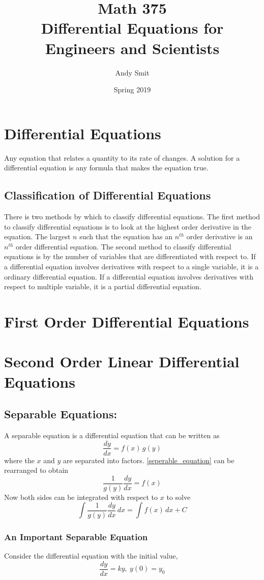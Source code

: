 \documentclass[14pt]{article}
\title{Math 375\\Differential Equations for Engineers and Scientists}
\author{Andy Smit}
\date{Spring 2019}
\begin{document}
    \maketitle
    \section{Differential Equations}
    Any equation that relates a quantity to its rate of changes.
    A solution for a differential equation is any formula that makes the equation true.
    \subsection{Classification of Differential Equations}
    There is two methods by which to classify differential equations.
    The first method to classify differential equations is to look at the highest order derivative in the equation.
    The largest $n$ such that the equation has an $n^{th}$ order derivative is an $n^{th}$ order differential equation.
    The second method to classify differential equations is by the number of variables that are differentiated with respect to.
    If a differential equation involves derivatives with respect to a single variable, it is a ordinary differential equation.
    If a differential equation involves derivatives with respect to multiple variable, it is a partial differential equation.
    \section{First Order Differential Equations}
    \section{Second Order Linear Differential Equations}
    \subsection{Separable Equations:}
    A separable equation is a differential equation that can be written as
    \begin{equation}\label{seperable_equation}
        \frac{dy}{dx}=f(x)\,g(y)
    \end{equation}
    where the $x$ and $y$ are separated into factors.
    \eqref{seperable_equation} can be rearranged to obtain
    $$\frac{1}{g(y)}\frac{dy}{dx}=f(x)$$
    Now both sides can be integrated with respect to $x$ to solve
    $$\int\frac{1}{g(y)}\frac{dy}{dx}\,dx=\int f(x)\,dx+C$$
    \subsubsection{An Important Separable Equation}
    Consider the differential equation with the initial value,
    \begin{equation}\label{exponential_growth}
        \frac{dy}{dx}=ky,\ y(0)=y_0
    \end{equation}
\end{document}
